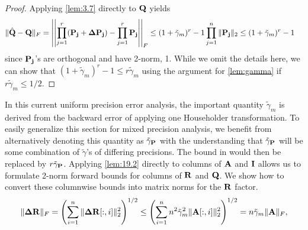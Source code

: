\begin{proof}
	Applying \cref{lem:3.7} directly to $\mathbf{Q}$ yields
	\begin{align*}
		\|\hat{\mathbf{Q}}-\mathbf{Q}\|_F &= \left|\left|\prod_{j=1}^r (\mathbf{P_j} + \mathbf{\Delta P_j})- \prod_{j=1}^r\mathbf{P_j} \right|\right|_F\leq(1+\tilde{\gamma}_m)^r-1\prod_{j=1}^n\|\mathbf{P_j}\|_2 \leq (1+\tilde{\gamma}_m)^r-1
	\end{align*}
	since $\mathbf{P_j}$'s are orthogonal and have 2-norm, 1.
	While we omit the details here, we can show that $(1+\tilde{\gamma}_m)^r-1 \leq r\tilde{\gamma}_m$ using the argument for \cref{lem:gamma} if $r\tilde{\gamma}_m \leq 1/2$.
\end{proof}
In this current uniform precision error analysis, the important quantity $\tilde{\gamma}_{m}$ is derived from the backward error of applying one Householder transformation.
To easily generalize this section for mixed precision analysis, we benefit from alternatively denoting this quantity as $\tilde{\gamma}_{\mathbf{P}}$ with the understanding that $\tilde{\gamma}_{\mathbf{P}}$ will be some combination of $\tilde{\gamma}$'s of differing precisions. 
The bound in  would then be  replaced by $r\tilde{\gamma}_{\mathbf{P}}$.
Applying \cref{lem:19.2} directly to columns of $\mathbf{A}$ and $\mathbf{I}$ allows us to formulate 2-norm forward bounds for columns of $\mathbf{R}$ and $\mathbf{Q}$.
We show how to convert these columnwise bounds into matrix norms for the $\mathbf{R}$ factor.
\begin{align*}
	\|\mathbf{\Delta R} \|_F &= \left(\sum_{i=1}^n \|\mathbf{\Delta R}[:,i]\|_2^2\right)^{1/2} \leq \left(\sum_{i=1}^n n^2\tilde{\gamma}_{m}^2 \|\mathbf{A}[:,i]\|_2^2\right)^{1/2} = n\tilde{\gamma}_{m} \|\mathbf{A}\|_F, \\
\end{align*}
